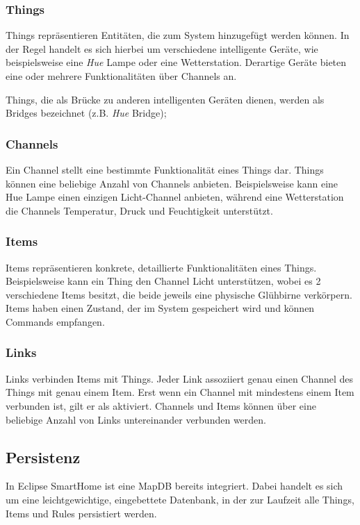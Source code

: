 \subsubsection{Things}
Things repräsentieren Entitäten, die zum System hinzugefügt werden können. In der Regel handelt es sich hierbei um verschiedene intelligente Geräte, wie beispielsweise eine \textit{Hue} Lampe oder eine Wetterstation. Derartige Geräte bieten eine oder mehrere Funktionalitäten über Channels an.

Things, die als Brücke zu anderen intelligenten Geräten dienen, werden als Bridges bezeichnet (z.B. \textit{Hue} Bridge);

\subsubsection{Channels}
Ein Channel stellt eine bestimmte Funktionalität eines Things dar. Things können eine beliebige Anzahl von Channels anbieten. Beispielsweise kann eine Hue Lampe einen einzigen \glqq Licht\grqq -Channel anbieten, während eine Wetterstation die Channels \glqq Temperatur\grqq , \glqq Druck\grqq{} und \glqq Feuchtigkeit\grqq{} unterstützt.

\subsubsection{Items}
Items repräsentieren konkrete, detaillierte Funktionalitäten eines Things. Beispielsweise kann ein Thing den Channel \glqq Licht\grqq{} unterstützen, wobei es 2 verschiedene Items besitzt, die beide jeweils eine physische Glühbirne verkörpern. Items haben einen Zustand, der im System gespeichert wird und können Commands empfangen.

\subsubsection{Links}
Links verbinden Items mit Things. Jeder Link assoziiert genau einen Channel des Things mit genau einem Item. Erst wenn ein Channel mit mindestens einem Item verbunden ist, gilt er als \glqq aktiviert\grqq{}. Channels und Items können über eine beliebige Anzahl von Links untereinander verbunden werden.


\subsection{Persistenz}
\label{subsec:persistenz}
In Eclipse SmartHome ist eine MapDB\cite{mapDB} bereits integriert. Dabei handelt es sich um eine leichtgewichtige, eingebettete Datenbank, in der zur Laufzeit alle Things, Items und Rules persistiert werden. 


